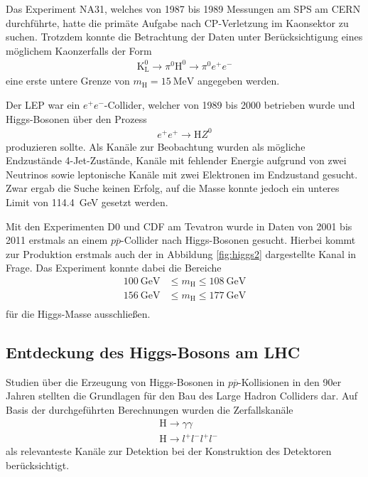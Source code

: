 
Das Experiment NA31, welches von 1987 bis 1989 Messungen am SPS am CERN durchführte, hatte die primäte Aufgabe nach CP-Verletzung im Kaonsektor zu suchen.
Trotzdem konnte die Betrachtung der Daten unter Berücksichtigung eines möglichem Kaonzerfalls der Form
\begin{align*}
	\text{K}_\text{L}^0 \rightarrow \pi^0 \text{H}^0 \rightarrow \pi^0 e^+ e^-
\end{align*}
eine erste untere Grenze von $m_\text{H} = \SI{15}{\mega\electronvolt}$ angegeben werden.

Der LEP war ein $e^+ e^-$-Collider, welcher von 1989 bis 2000 betrieben wurde und Higgs-Bosonen über den Prozess
\begin{align*}
	e^+ e^+ \rightarrow \text{H} Z^0
\end{align*}
produzieren sollte.
Als Kanäle zur Beobachtung wurden als mögliche Endzustände 4-Jet-Zustände, Kanäle mit fehlender Energie aufgrund von zwei Neutrinos sowie leptonische Kanäle mit zwei Elektronen im Endzustand gesucht.
Zwar ergab die Suche keinen Erfolg, auf die Masse konnte jedoch ein unteres Limit von \SI{114.4}{\giga\electronvolt} gesetzt werden.

Mit den Experimenten D0 und CDF am Tevatron wurde in Daten von 2001 bis 2011 erstmals an einem $p\overline{p}$-Collider nach Higgs-Bosonen gesucht.
Hierbei kommt zur Produktion erstmals auch der in Abbildung \ref{fig:higgs2} dargestellte Kanal in Frage.
Das Experiment konnte dabei die Bereiche
\begin{align*}
	\SI{100}{\giga\electronvolt} &\leq m_\text{H} \leq \SI{108}{\giga\electronvolt} \\
	\SI{156}{\giga\electronvolt} &\leq m_\text{H} \leq \SI{177}{\giga\electronvolt} \\
\end{align*}
für die Higgs-Masse ausschließen.

\subsection{Entdeckung des Higgs-Bosons am LHC}

Studien über die Erzeugung von Higgs-Bosonen in $p\overline{p}$-Kollisionen in den 90er Jahren stellten die Grundlagen für den Bau des Large Hadron Colliders dar.
Auf Basis der durchgeführten Berechnungen wurden die Zerfallskanäle
\begin{align*}
	&\text{H} \rightarrow \gamma \gamma \\
	&\text{H} \rightarrow l^+ l^- l^+ l^- 
\end{align*}
als relevanteste Kanäle zur Detektion bei der Konstruktion des Detektoren berücksichtigt.

